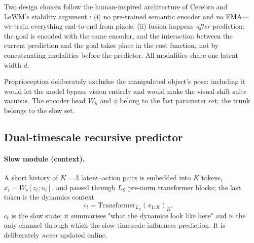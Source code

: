 Two design choices follow the human-inspired architecture of Cerebro \cite{cerebro-internal}
and LeWM's stability argument \cite{maes-2026-lewm}: (i) no pre-trained semantic encoder and
no EMA---we train everything end-to-end from pixels; (ii) fusion happens \emph{after}
prediction: the goal is encoded with the same encoder, and the interaction between the current
prediction and the goal takes place in the cost function, not by concatenating modalities
before the predictor. All modalities share one latent width $d$.

Proprioception deliberately excludes the manipulated object's pose: including it would let the
model bypass vision entirely and would make the visual-shift suite vacuous. The encoder head
$W_h$ and $\phi$ belong to the fast parameter set; the trunk belongs to the slow set.

\subsection{Dual-timescale recursive predictor}\label{sec:predictor}

\paragraph{Slow module (context).} A short history of $K=3$ latent--action pairs is embedded
into $K$ tokens, $x_i = W_s[z_i;u_i]$, and passed through $L_S$ pre-norm transformer blocks;
the last token is the dynamics context
\begin{equation}
c_t = \mathrm{Transformer}_{L_S}(x_{1:K})_K .
\end{equation}
$c_t$ is the slow state: it summarises "what the dynamics look like here" and is the only
channel through which the slow timescale influences prediction. It is deliberately
\emph{never} updated online.

